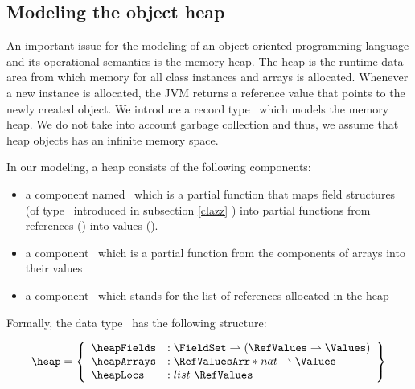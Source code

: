 \index{\HeapSet}
\index{\heap}
\index{\heapArrays}
\index{\heapArrays} 
\index{\heapTypeOf}
\newtheorem{heapDef}{Definition}[section]

 \subsection{Modeling the object heap} \label{heap}
 An important issue for the modeling of an object oriented programming language and its operational semantics
 is the memory heap. The heap is the
 runtime data area from which memory  for all class instances and arrays is allocated. Whenever a new instance
 is allocated, the JVM returns a reference value that points to the newly created object. 
 We introduce a record type \HeapSet \ which models the memory heap. We do not take into account 
 garbage collection and thus, we assume that heap objects has an infinite memory space. 
 
 In our modeling, a heap consists of the following components:
 \begin{itemize}
       \item a component  named \heapFields \ which is a partial function that maps field
             structures (of type \FieldSet \ introduced in subsection \ref{clazz} ) into partial functions from references (\AllRefs)
	     into values (\Values).  
 

       \item  a component \heapArrays \ which is a partial function from the components of arrays  into their values

       \item  a component  \heapLocs  \ which stands for the  list of references allocated in the heap
              
 \end{itemize}


 Formally, the data type \HeapSet \ has the following structure:



  $$ \begin{array}{l}
         
         \heap = \left\{\begin{array}{ll}  \heapFields  &  : \FieldSet \rightharpoonup (  \RefValues \rightharpoonup \Values) \\
                                           \heapArrays  &  : \RefValuesArr * nat \rightharpoonup \Values \\
					   \heapLocs    &  : list \ \RefValues \\
                    \end{array} \right\}
   \end{array} $$


